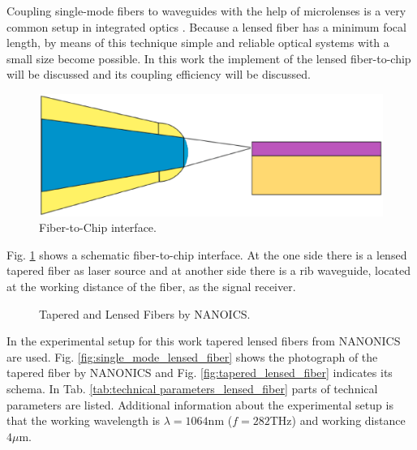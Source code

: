 Coupling single-mode fibers to waveguides with the help of microlenses is a very common setup in integrated optics \cite{integrated_optics}. Because a lensed fiber has a minimum focal length, by means of this technique simple and reliable optical systems with a small size become possible. In this work the implement of the lensed fiber-to-chip will be discussed and its coupling efficiency will be discussed.\\

\begin{figure}[!ht]
\centering
\includegraphics[width=.7\textwidth]{bilder/experiment_object}
\caption{Fiber-to-Chip interface.}
\label{fig:experiment_object}
\end{figure}
Fig. \ref{fig:experiment_object} shows a schematic fiber-to-chip interface. At the one side there is a lensed tapered fiber as laser source and at another side there is a rib waveguide\cite{integrated_optics}, located at the working distance of the fiber, as the signal receiver.\\
 
\begin{figure}[!ht]
\centering
{}
\hfill
{}
\label{fig:TLFs}
\caption{ Tapered and Lensed Fibers by NANOICS.}
\end{figure}
In the experimental setup for this work tapered lensed fibers from NANONICS\cite{nanoscal_tapered_fiber} are used. Fig. \ref{fig:single_mode_lensed_fiber} shows the photograph of the tapered fiber by NANONICS and Fig. \ref{fig:tapered_lensed_fiber} indicates its schema. In Tab. \ref{tab:technical parameters_lensed_fiber} parts of technical parameters are listed. Additional information about the experimental setup is that the working wavelength is $\lambda=1064$nm ($f=282$THz) and working distance $4\mu$m.\\
 
